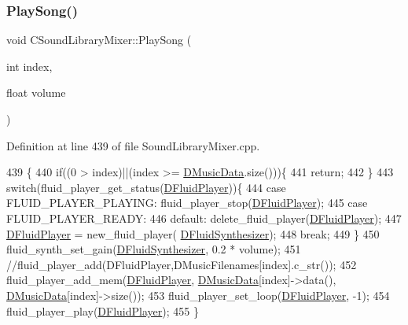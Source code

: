 \subsubsection{\texorpdfstring{Play\+Song()}{PlaySong()}}
{\footnotesize\ttfamily void C\+Sound\+Library\+Mixer\+::\+Play\+Song (\begin{DoxyParamCaption}\item[{int}]{index,  }\item[{float}]{volume }\end{DoxyParamCaption})}



Definition at line 439 of file Sound\+Library\+Mixer.\+cpp.


\begin{DoxyCode}
439                                                         \{
440     \textcolor{keywordflow}{if}((0 > index)||(index >= \hyperlink{classCSoundLibraryMixer_a494744db8ea800dd1443418711183846}{DMusicData}.size()))\{
441         \textcolor{keywordflow}{return};   
442     \}
443     \textcolor{keywordflow}{switch}(fluid\_player\_get\_status(\hyperlink{classCSoundLibraryMixer_a6773ddf83ef86bc27598f6c5cee61d9c}{DFluidPlayer}))\{
444         \textcolor{keywordflow}{case} FLUID\_PLAYER\_PLAYING:  fluid\_player\_stop(\hyperlink{classCSoundLibraryMixer_a6773ddf83ef86bc27598f6c5cee61d9c}{DFluidPlayer});
445         \textcolor{keywordflow}{case} FLUID\_PLAYER\_READY:    
446         \textcolor{keywordflow}{default}:                    delete\_fluid\_player(\hyperlink{classCSoundLibraryMixer_a6773ddf83ef86bc27598f6c5cee61d9c}{DFluidPlayer});
447                                     \hyperlink{classCSoundLibraryMixer_a6773ddf83ef86bc27598f6c5cee61d9c}{DFluidPlayer} = new\_fluid\_player(
      \hyperlink{classCSoundLibraryMixer_a6c1663c381dbf2aa18c82a23141f409c}{DFluidSynthesizer});
448                                     \textcolor{keywordflow}{break};
449     \}
450     fluid\_synth\_set\_gain(\hyperlink{classCSoundLibraryMixer_a6c1663c381dbf2aa18c82a23141f409c}{DFluidSynthesizer}, 0.2 * volume);
451     \textcolor{comment}{//fluid\_player\_add(DFluidPlayer,DMusicFilenames[index].c\_str());}
452     fluid\_player\_add\_mem(\hyperlink{classCSoundLibraryMixer_a6773ddf83ef86bc27598f6c5cee61d9c}{DFluidPlayer}, \hyperlink{classCSoundLibraryMixer_a494744db8ea800dd1443418711183846}{DMusicData}[index]->data(), 
      \hyperlink{classCSoundLibraryMixer_a494744db8ea800dd1443418711183846}{DMusicData}[index]->size());
453     fluid\_player\_set\_loop(\hyperlink{classCSoundLibraryMixer_a6773ddf83ef86bc27598f6c5cee61d9c}{DFluidPlayer}, -1);
454     fluid\_player\_play(\hyperlink{classCSoundLibraryMixer_a6773ddf83ef86bc27598f6c5cee61d9c}{DFluidPlayer});
455 \}
\end{DoxyCode}
